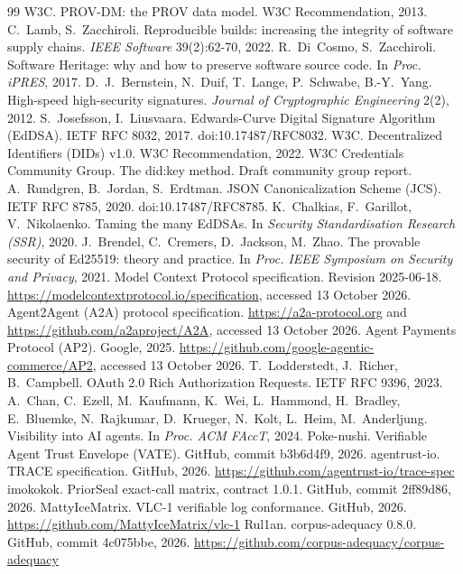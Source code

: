 \documentclass[11pt,a4paper]{article}
\begin{document}
\begin{thebibliography}{99}
 W3C. PROV-DM: the PROV data model. W3C Recommendation, 2013.
 C.~Lamb, S.~Zacchiroli. Reproducible builds: increasing the integrity of software supply chains. \emph{IEEE Software} 39(2):62-70, 2022.
 R.~Di~Cosmo, S.~Zacchiroli. Software Heritage: why and how to preserve software source code. In \emph{Proc. iPRES}, 2017.
 D.~J.~Bernstein, N.~Duif, T.~Lange, P.~Schwabe, B.-Y.~Yang. High-speed high-security signatures. \emph{Journal of Cryptographic Engineering} 2(2), 2012.
 S.~Josefsson, I.~Liusvaara. Edwards-Curve Digital Signature Algorithm (EdDSA). IETF RFC 8032, 2017. doi:10.17487/RFC8032.
 W3C. Decentralized Identifiers (DIDs) v1.0. W3C Recommendation, 2022.
 W3C Credentials Community Group. The did:key method. Draft community group report.
 A.~Rundgren, B.~Jordan, S.~Erdtman. JSON Canonicalization Scheme (JCS). IETF RFC 8785, 2020. doi:10.17487/RFC8785.
 K.~Chalkias, F.~Garillot, V.~Nikolaenko. Taming the many EdDSAs. In \emph{Security Standardisation Research (SSR)}, 2020.
 J.~Brendel, C.~Cremers, D.~Jackson, M.~Zhao. The provable security of Ed25519: theory and practice. In \emph{Proc. IEEE Symposium on Security and Privacy}, 2021.
 Model Context Protocol specification. Revision 2025-06-18. \url{https://modelcontextprotocol.io/specification}, accessed 13 October 2026.
 Agent2Agent (A2A) protocol specification. \url{https://a2a-protocol.org} and \url{https://github.com/a2aproject/A2A}, accessed 13 October 2026.
 Agent Payments Protocol (AP2). Google, 2025. \url{https://github.com/google-agentic-commerce/AP2}, accessed 13 October 2026.
 T.~Lodderstedt, J.~Richer, B.~Campbell. OAuth 2.0 Rich Authorization Requests. IETF RFC 9396, 2023.
 A.~Chan, C.~Ezell, M.~Kaufmann, K.~Wei, L.~Hammond, H.~Bradley, E.~Bluemke, N.~Rajkumar, D.~Krueger, N.~Kolt, L.~Heim, M.~Anderljung. Visibility into AI agents. In \emph{Proc. ACM FAccT}, 2024.
 Poke-nushi. Verifiable Agent Trust Envelope (VATE). GitHub, commit b3b6d4f9, 2026.
 agentrust-io. TRACE specification. GitHub, 2026. \url{https://github.com/agentrust-io/trace-spec}
 imokokok. PriorSeal exact-call matrix, contract 1.0.1. GitHub, commit 2ff89d86, 2026.
 MattyIceMatrix. VLC-1 verifiable log conformance. GitHub, 2026. \url{https://github.com/MattyIceMatrix/vlc-1}
 Rul1an. corpus-adequacy 0.8.0. GitHub, commit 4c075bbe, 2026. \url{https://github.com/corpus-adequacy/corpus-adequacy}

\end{thebibliography}
\end{document}
